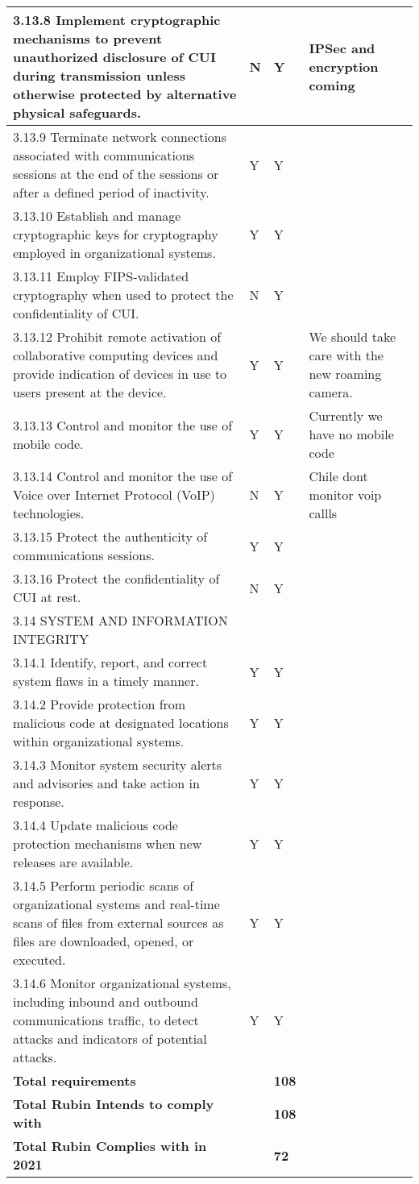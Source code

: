 \begin{longtable} {|p{}|p{}|p{}|p{} |}
{3.13.8 Implement cryptographic mechanisms to prevent unauthorized disclosure of CUI during transmission unless otherwise protected by alternative physical safeguards.}&{N}&{Y}&{IPSec and encryption coming} \\ \hline
{3.13.9 Terminate network connections associated with communications sessions at the end of the sessions or after a defined period of inactivity.}&{Y}&{Y}& \\ \hline
{3.13.10 Establish and manage cryptographic keys for cryptography employed in organizational systems.}&{Y}&{Y}& \\ \hline
{3.13.11 Employ FIPS-validated cryptography when used to protect the confidentiality of CUI.}&{N}&{Y}& \\ \hline
{3.13.12 Prohibit remote activation of collaborative computing devices and provide indication of devices in use to users present at the device.}&{Y}&{Y}&{We should take care with the new roaming camera.} \\ \hline
{3.13.13 Control and monitor the use of mobile code.}&{Y}&{Y}&{Currently we have no mobile code} \\ \hline
{3.13.14 Control and monitor the use of Voice over Internet Protocol (VoIP) technologies.}&{N}&{Y}&{Chile dont monitor voip callls} \\ \hline
{3.13.15 Protect the authenticity of communications sessions.}&{Y}&{Y}& \\ \hline
{3.13.16 Protect the confidentiality of CUI at rest.}&{N}&{Y}& \\ \hline
{3.14 SYSTEM AND INFORMATION INTEGRITY}&&& \\ \hline
{3.14.1 Identify, report, and correct system flaws in a timely manner.}&{Y}&{Y}& \\ \hline
{3.14.2 Provide protection from malicious code at designated locations within organizational systems.}&{Y}&{Y}& \\ \hline
{3.14.3 Monitor system security alerts and advisories and take action in response.}&{Y}&{Y}& \\ \hline
{3.14.4 Update malicious code protection mechanisms when new releases are available.}&{Y}&{Y}& \\ \hline
{3.14.5 Perform periodic scans of organizational systems and real-time scans of files from external sources as files are downloaded, opened, or executed.}&{Y}&{Y}& \\ \hline
{3.14.6 Monitor organizational systems, including inbound and outbound communications traffic, to detect attacks and indicators of potential attacks.}&{Y}&{Y}& \\ \hline
\textbf{Total requirements}&\textbf{}&\textbf{108}& \\ \hline
\textbf{Total Rubin Intends to comply with }&\textbf{}&\textbf{108}& \\ \hline
\textbf{Total Rubin Complies with in 2021}&\textbf{}&\textbf{72}& \\ \hline
\end{longtable} \normalsize
